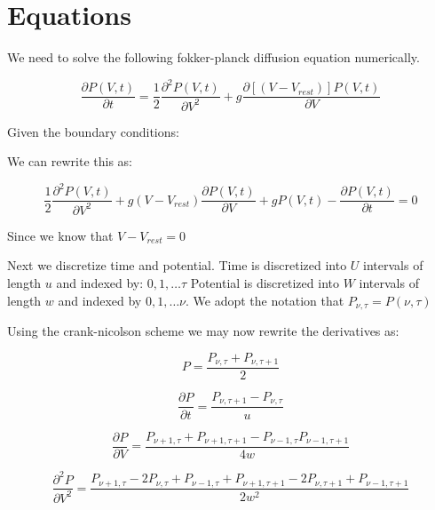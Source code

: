 \documentclass[10pt]{article}
\begin{document}
 

\section{Equations}

We need to solve the following fokker-planck diffusion equation
numerically.

\begin{equation}
    \frac{\partial P(V,t)}{\partial t} =
    \frac{1}{2} \frac{\partial^2 P(V,t) } {\partial V^2} +
    g\frac{\partial[(V-V_{rest})]P(V,t)}{\partial V}
\end{equation}

Given the boundary conditions:

We can rewrite this as:

\begin{equation}
    \frac{1}{2} \frac{\partial^2 P(V,t) } {\partial V^2} +
    g(V-V_{rest})\frac{\partial P(V,t)}{\partial V} +
    gP(V,t) -
    \frac{\partial P(V,t)}{\partial t} = 
    0
\end{equation}

Since we know that $ V-V_{rest} = 0 $

Next we discretize time and potential. Time is discretized  into $U$
intervals of length $u$ and indexed by: $ 0,1, \dots \tau $ Potential
is discretized into $W$ intervals of length $w$ and indexed by $ 0,1,
\dots \nu $. We adopt the notation that $P_{\nu,\tau} = P(\nu,\tau)$ 

Using the crank-nicolson scheme we  may now rewrite the derivatives as:

\begin{equation}
    P = \frac{P_{\nu,\tau} + P_{\nu,\tau + 1}}{2}
\end{equation}

\begin{equation}
    \frac{\partial P}{\partial t} = \frac{P_{\nu,\tau +1 } -
    P_{\nu,\tau}}{u}
\end{equation}

\begin{equation}
    \frac{\partial P}{\partial V} = 
    \frac{P_{\nu +1,\tau } + P_{\nu +1,\tau +1 } -
    P_{\nu - 1,\tau } P_{\nu -1,\tau +1}}
    {4w}
\end{equation}

\begin{equation}
    \frac{\partial^2 P}{\partial V^2} = 
    \frac{P_{\nu+1,\tau} - 2 P_{\nu,\tau} + P_{\nu-1,\tau} +
    P_{\nu+1,\tau+1} - 2 P_{\nu,\tau+1} + P_{\nu-1,\tau+1}}
    {2w^2}
\end{equation}
\end{document}
